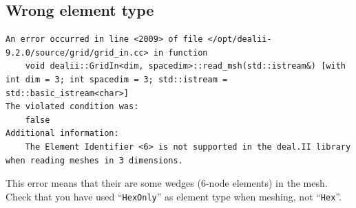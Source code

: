 \documentclass[a4paper]{scrartcl}
\begin{document}
	
	\subsection{Wrong element type}
\begin{lstlisting}
An error occurred in line <2009> of file </opt/dealii-9.2.0/source/grid/grid_in.cc> in function
    void dealii::GridIn<dim, spacedim>::read_msh(std::istream&) [with int dim = 3; int spacedim = 3; std::istream = std::basic_istream<char>]
The violated condition was:
    false
Additional information:
    The Element Identifier <6> is not supported in the deal.II library when reading meshes in 3 dimensions.
\end{lstlisting}
This error means that their are some wedges (6-node elements) in the mesh. Check that you have used ``\texttt{HexOnly}'' as element type when meshing, not ``\texttt{Hex}''.
	
	


\end{document}
